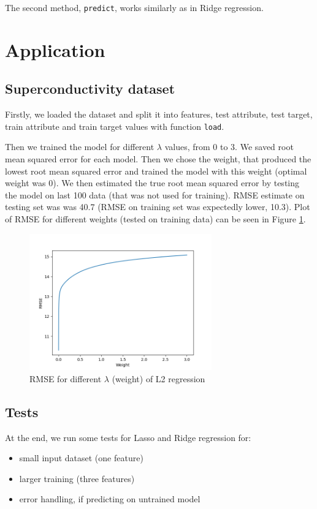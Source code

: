 \documentclass{article}
\begin{document}
The second method, \texttt{predict}, works similarly as in Ridge regression.

\section{Application}

\subsection{Superconductivity dataset}

Firstly, we loaded the dataset and split it into features, test attribute, test target, train attribute and train target values with function \texttt{load}.

Then we trained the model for different $\lambda$ values, from 0 to 3. We saved root mean squared error for each model. Then we chose the weight, that produced the lowest root mean squared error and trained the model with this weight (optimal weight was 0). We then estimated the true root mean squared error by testing the model on last 100 data (that was not used for training). RMSE estimate on testing set was was 40.7 (RMSE on training set was expectedly lower, 10.3). Plot of RMSE for different weights (tested on training data) can be seen in Figure \ref{fig:f}.

\begin{figure}[!h]
    \centering
    \includegraphics[width=0.7\textwidth]{homework-03/plots/ridge.png}
    \caption{RMSE for different $\lambda$ (weight) of L2 regression}
    \label{fig:f}
\end{figure}

\subsection{Tests}

At the end, we run some tests for Lasso and Ridge regression for:
\begin{itemize}
    \item small input dataset (one feature)
    \item larger training (three features)
    \item error handling, if predicting on untrained model
\end{itemize}

\printbibliography
\end{document}

